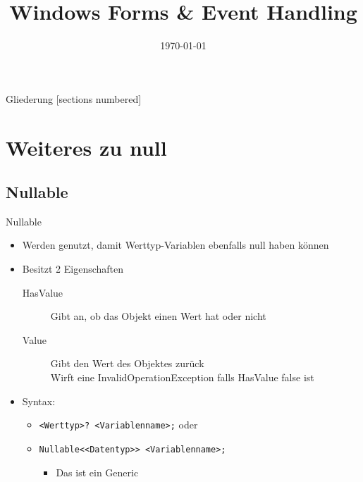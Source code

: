 



\title{Windows Forms \& Event Handling}
\date{\today}




\maketitle

\begin{frame}{Gliederung}
	[sections numbered]
	\tableofcontents
\end{frame}

\section{Weiteres zu null}
\subsection{Nullable}
\begin{frame}{Nullable}
	\begin{itemize}
		\item Werden genutzt, damit Werttyp-Variablen ebenfalls \alert{null} haben können
		\item Besitzt 2 Eigenschaften
		\begin{description}
			\item[HasValue] Gibt an, ob das Objekt einen Wert hat oder nicht
			\item[Value] Gibt den Wert des Objektes zurück\\ Wirft eine InvalidOperationException falls HasValue \alert{false} ist 
		\end{description}
		\item Syntax:
		\begin{itemize}
			\item \texttt{\alert{<Werttyp>}? \alert{<Variablenname>};} oder
			\item \texttt{Nullable<\alert{<Datentyp>}> \alert{<Variablenname>};}
			\begin{itemize}
				\item Das ist ein Generic
			\end{itemize}
		\end{itemize}
	\end{itemize}
\end{frame}

